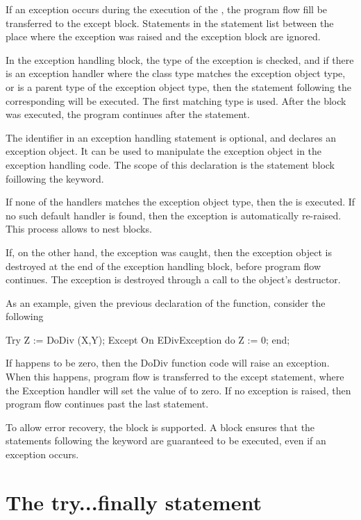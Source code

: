 \documentclass{report}
\begin{document}
If an exception occurs during the execution of the , the
program flow fill be transferred to the except block. Statements in the
statement list between the place where the exception was raised and the
exception block are ignored.


In the exception handling block, the type of the exception is checked, 
and if there is an exception handler where the class type matches the 
exception object type, or is a parent type of
the exception object type, then the statement following the corresponding 
 will be executed. The first matching type is used. After the
 block was executed, the program continues after the 
statement.

The identifier in an exception handling statement is optional, and declares 
an exception object. It can be used to manipulate the exception object in 
the exception handling code. The scope of this declaration is the statement 
block foillowing the  keyword.

If none of the  handlers matches the exception object type, then the
 is executed. If no such default handler is 
found, then the exception is automatically re-raised. This process allows
to nest  blocks.

If, on the other hand, the exception was caught, then the exception object is 
destroyed at the end of the exception handling block, before program flow
continues. The exception is destroyed through a call to the object's
 destructor.

As an example, given the previous declaration of the  function,
consider the following
\begin{listing}
Try
  Z := DoDiv (X,Y);
Except
  On EDivException do Z := 0;
end;
\end{listing}
If  happens to be zero, then the DoDiv function code will raise an
exception. When this happens, program flow is transferred to the except
statement, where the Exception handler will set the value of  to
zero. If no exception is raised, then program flow continues past the last
 statement.

To allow error recovery, the  block is supported.
A  block ensures that the statements following the
 keyword are guaranteed to be executed, even if an exception
occurs.

\section{The try...finally statement}
\end{document}
